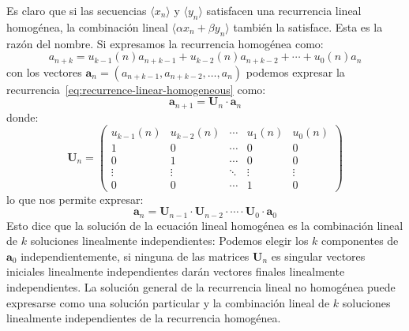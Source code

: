   Es claro que si las secuencias \(\langle x_n \rangle\)
  y \(\langle y_n \rangle\) satisfacen una recurrencia lineal homogénea,
  la combinación lineal \(\langle \alpha x_n + \beta y_n \rangle\)
  también la satisface.
  Esta es la razón del nombre.
  Si expresamos la recurrencia homogénea como:
  \begin{equation}
    \label{eq:recurrence-linear-homogeneous}
    a_{n + k}
      = u_{k - 1}(n) a_{n + k - 1}
	 + u_{k - 2}(n) a_{n + k - 2}
	 + \dotsb
	 + u_0(n) a_n
  \end{equation}
  con los vectores%
    \(\boldsymbol{a}_n = (a_{n + k - 1}, a_{n + k - 2}, \dotsc, a_n)\)
  podemos expresar la recurrencia~\eqref{eq:recurrence-linear-homogeneous}
  como:%
  \begin{equation}
    \label{eq:recurrence-linear-homogeneous-matrix-form}
    \boldsymbol{a}_{n + 1}
      = \boldsymbol{U}_n \cdot \boldsymbol{a}_n
  \end{equation}
  donde:
  \begin{equation}
    \label{eq:recurrence-linear-homogeneous-matrix}
    \boldsymbol{U}_n
      = \begin{pmatrix}
	  u_{k - 1}(n) & u_{k - 2}(n) & \cdots & u_1(n) & u_0(n) \\
	  1	       & 0	      & \cdots & 0	&   0	 \\
	  0	       & 1	      & \cdots & 0	&   0	 \\
	  \vdots       & \vdots	      & \ddots & \vdots & \vdots \\
	  0	       & 0	      & \cdots & 1	&   0
	\end{pmatrix}
  \end{equation}
  lo que nos permite expresar:
  \begin{equation}
    \label{eq:recurrence-linear-homogeneous-matrix-soln}
    \boldsymbol{a}_n
      = \boldsymbol{U}_{n - 1}
	  \cdot \boldsymbol{U}_{n - 2}
	  \cdot \dotsb
	  \cdot \boldsymbol{U}_0
	  \cdot \boldsymbol{a}_0
  \end{equation}
  Esto dice que la solución de la ecuación lineal homogénea
  es la combinación lineal
  de \(k\) soluciones linealmente independientes:%
  Podemos elegir
  los \(k\) componentes de \(\boldsymbol{a}_0\) independientemente,
  si ninguna de las matrices \(\boldsymbol{U}_n\) es singular
  vectores iniciales linealmente independientes
  darán vectores finales linealmente independientes.
  La solución general de la recurrencia lineal no homogénea
  puede expresarse como una solución particular%
  y la combinación lineal de \(k\) soluciones linealmente independientes
  de la recurrencia homogénea.

